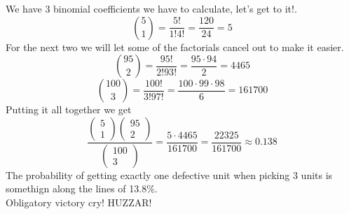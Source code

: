 \documentclass[12pt]{article}
\begin{document}
We have 3 binomial coefficients we have to calculate,  let's get to it!.
\[
\binom{5}{1} = \frac{5!}{1!4!} = \frac{120}{24} = 5
\]
For the next two we will let some of the factorials cancel out to make it easier.
\[
\binom{95}{2} = \frac{95!}{2!93!} = \frac{95 \cdot 94}{2} = 4465
\]
\[
\binom{100}{3} = \frac{100!}{3!97!} = \frac{100 \cdot 99 \cdot 98}{6} = 161700
\]
Putting it all together we get
\[
\frac{\begin{pmatrix} 5\\1\end{pmatrix}\begin{pmatrix} 95\\2\end{pmatrix}
}{\begin{pmatrix} 100\\3\end{pmatrix}} = \frac{5 \cdot 4465}{161700} = \frac{22325}{161700} \approx 0.138
\]
The probability of getting exactly one defective unit when picking 3 units is somethign along the lines of 13.8\%.\\
Obligatory victory cry! HUZZAR!












\printbibliography %
\end{document}
